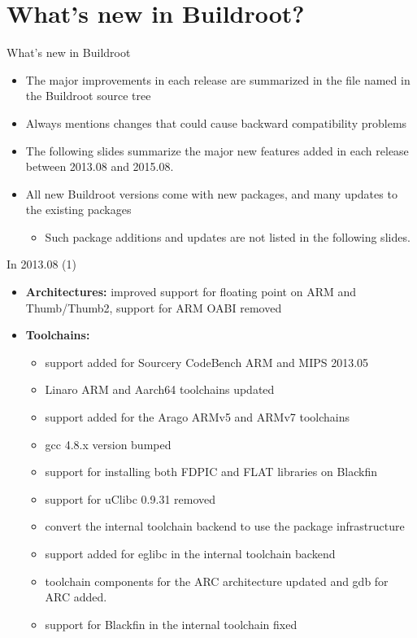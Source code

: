 \section{What's new in Buildroot?}

\begin{frame}{What's new in Buildroot}
  \begin{itemize}
  \item The major improvements in each release are summarized in the
    file named  in the Buildroot source tree
  \item Always mentions changes that could cause backward
    compatibility problems
  \item The following slides summarize the major new features added in
    each release between 2013.08 and 2015.08.
  \item All new Buildroot versions come with new packages, and many
    updates to the existing packages
    \begin{itemize}
    \item Such package additions and updates are not listed in the
      following slides.
    \end{itemize}
  \end{itemize}
\end{frame}

\begin{frame}{In 2013.08 (1)}
  \begin{itemize}
  \item {\bf Architectures:} improved support for floating point on
    ARM and Thumb/Thumb2, support for ARM OABI removed
  \item {\bf Toolchains:}
    \begin{itemize}
    \item support added for Sourcery CodeBench ARM and MIPS 2013.05
    \item Linaro ARM and Aarch64 toolchains updated
    \item support added for the Arago ARMv5 and ARMv7 toolchains
    \item gcc 4.8.x version bumped
    \item support for installing both FDPIC and FLAT libraries on
      Blackfin
    \item support for uClibc 0.9.31 removed
    \item convert the internal toolchain backend to use the package
      infrastructure
    \item support added for eglibc in the internal toolchain backend
    \item toolchain components for the ARC architecture updated and
      gdb for ARC added.
    \item support for Blackfin in the internal toolchain fixed
    \end{itemize}
  \end{itemize}
\end{frame}

